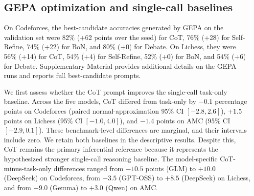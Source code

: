 \documentclass[a4paper]{article}
\theoremstyle{plain}
\theoremstyle{definition}
\theoremstyle{remark}
\begin{document}
\subsection{GEPA optimization and single-call baselines}
On Codeforces, the best-candidate accuracies generated by GEPA on the validation set were 82\% (+62 points over the seed) for CoT, 76\% (+28) for Self-Refine, 74\% (+22) for BoN, and 80\% (+0) for Debate.
On Lichess, they were 56\% (+14) for CoT, 54\% (+4) for Self-Refine, 52\% (+0) for BoN, and 54\% (+6) for Debate.
Supplementary Material provides additional details on the GEPA runs and reports full best-candidate prompts.

We first assess whether the CoT prompt improves the single-call task-only baseline.
Across the five models, CoT differed from task-only by $-0.1$ percentage points on Codeforces (paired normal-approximation 95\% CI $[-2.8, 2.6]$), $+1.5$ points on Lichess (95\% CI $[-1.0, 4.0]$), and $-1.4$ points on AMC (95\% CI $[-2.9, 0.1]$).
These benchmark-level differences are marginal, and their intervals include zero.
We retain both baselines in the descriptive results.
Despite this, CoT remains the primary inferential reference because it represents the hypothesized stronger single-call reasoning baseline.
The model-specific CoT-minus-task-only differences ranged from $-10.5$ points (GLM) to $+10.0$ (DeepSeek) on Codeforces, from $-3.5$ (GPT-OSS) to $+8.5$ (DeepSeek) on Lichess, and from $-9.0$ (Gemma) to $+3.0$ (Qwen) on AMC.
\end{document}
